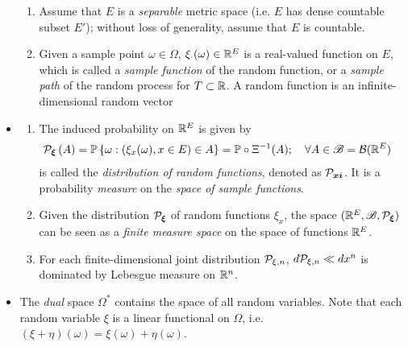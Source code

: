 \documentclass[11pt]{article}
\begin{document}
\begin{itemize}
\begin{definition}
\begin{enumerate}
\item Assume that $E$ is a \emph{separable} metric space (i.e. $E$ has dense countable subset $E'$); without loss of generality, assume that $E$ is countable.

\item Given a sample point $\omega\in \Omega$, $\xi_{\cdot}(\omega)\in {\mathbb R}^{E}$ is a real-valued function on $E$, which is called  a \emph{sample function} of the random function, or a \emph{sample path} of the random process for $T\subset {\mathbb R}$.  A random function is an infinite-dimensional random vector\\[5pt]
\end{enumerate}
\end{definition}


\item \begin{definition} \citep{lifshits2013gaussian}
\begin{enumerate}
\item The induced probability on ${\mathbb R}^{E}$ is given by 
\begin{align*}
{\mathcal P}_{\boldsymbol{\xi}}\left(A\right) &= {\mathbb P}\left\{\omega: (\xi_{x}(\omega), x\in E) \in A \right\}= {\mathbb P}\circ \Xi^{-1}(A); \quad \forall A\in {\mathscr B}={\mathcal B}({\mathbb R}^{E})
\end{align*}
is called the \emph{distribution of random functions}, denoted as ${\mathcal P}_{\boldsymbol{xi}}$. It is a probability \emph{measure} on the \emph{space of sample functions}. 

\item Given the distribution ${\mathcal P}_{\boldsymbol{\xi}}$ of random functions $\xi_{x}$, the space $({\mathbb R}^{E}, {\mathscr B}, {\mathcal P}_{\boldsymbol{\xi}})$ can be seen as a \emph{finite measure space} on the space of functions ${\mathbb R}^{E}$. 

\item For each finite-dimensional  joint  distribution ${\mathcal P}_{\xi, n}$, \; $d{\mathcal P}_{\xi, n} \ll dx^{n}$ is dominated by Lebesgue measure on ${\mathbb R}^{n}$.  \\[5pt]
\end{enumerate}
\end{definition}


\item The \emph{dual} space $\Omega^{*}$ contains the space of  all random variables. Note that each random variable $\xi$ is a linear functional on $\Omega$, i.e. $(\xi+\eta)(\omega)= \xi(\omega)+ \eta(\omega)$. \\



\end{itemize}
\end{document}
